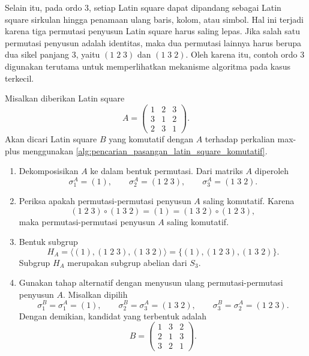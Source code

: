 Selain itu, pada ordo $3$, setiap Latin square dapat dipandang sebagai Latin square sirkulan hingga penamaan ulang baris, kolom, atau simbol. Hal ini terjadi karena tiga permutasi penyusun Latin square harus saling lepas. Jika salah satu permutasi penyusun adalah identitas, maka dua permutasi lainnya harus berupa dua sikel panjang $3$, yaitu $(1\;2\;3)$ dan $(1\;3\;2)$. Oleh karena itu, contoh ordo $3$ digunakan terutama untuk memperlihatkan mekanisme algoritma pada kasus terkecil.

\begin{contoh}\label{contoh:penerapan_algoritma_ordo_3}
  Misalkan diberikan Latin square
  \[
    A=
    \begin{pmatrix}
      1 & 2 & 3 \\
      3 & 1 & 2 \\
      2 & 3 & 1
    \end{pmatrix}.
  \]
  Akan dicari Latin square $B$ yang komutatif dengan $A$ terhadap perkalian
  max-plus menggunakan \autoref{alg:pencarian_pasangan_latin_square_komutatif}.

  \begin{enumerate}
    \item Dekomposisikan $A$ ke dalam bentuk permutasi. Dari matriks $A$
          diperoleh
          \[
            \sigma_1^A=(1),\qquad
            \sigma_2^A=(1\;2\;3),\qquad
            \sigma_3^A=(1\;3\;2).
          \]

    \item Periksa apakah permutasi-permutasi penyusun $A$ saling komutatif.
          Karena
          \[
            (1\;2\;3)\circ(1\;3\;2)
            =
            (1)
            =
            (1\;3\;2)\circ(1\;2\;3),
          \]
          maka permutasi-permutasi penyusun $A$ saling komutatif.

    \item Bentuk subgrup
          \[
            H_A=
            \langle (1),(1\;2\;3),(1\;3\;2)\rangle
            =
            \{(1),(1\;2\;3),(1\;3\;2)\}.
          \]
          Subgrup $H_A$ merupakan subgrup abelian dari $S_3$.

    \item Gunakan tahap alternatif dengan menyusun ulang permutasi-permutasi
          penyusun $A$. Misalkan dipilih
          \[
            \sigma_1^B=\sigma_1^A=(1),\qquad
            \sigma_2^B=\sigma_3^A=(1\;3\;2),\qquad
            \sigma_3^B=\sigma_2^A=(1\;2\;3).
          \]
          Dengan demikian, kandidat yang terbentuk adalah
          \[
            B=
            \begin{pmatrix}
              1 & 3 & 2 \\
              2 & 1 & 3 \\
              3 & 2 & 1
            \end{pmatrix}.
          \]


\end{enumerate}
\end{contoh}
